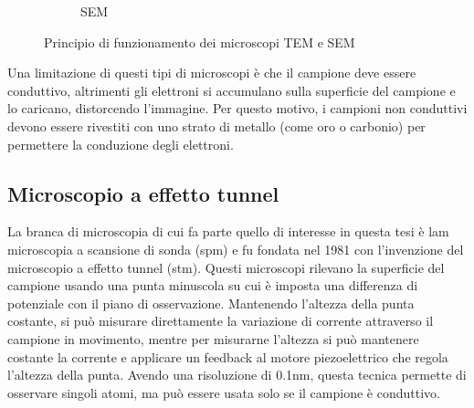 \documentclass[../main.tex]{subfiles}
\begin{document}
\begin{figure}[htbp]
\begin{subfigure}[t]{5cm}
	\caption{SEM}
\end{subfigure}%
\caption{Principio di funzionamento dei microscopi TEM e SEM}
\label{fig:em_diag}
\end{figure}

Una limitazione di questi tipi di microscopi è che il campione deve essere conduttivo, altrimenti gli elettroni si accumulano sulla superficie del campione e lo caricano, distorcendo l'immagine. Per questo motivo, i campioni non conduttivi devono essere rivestiti con uno strato di metallo (come oro o carbonio) per permettere la conduzione degli elettroni.


\subsection{Microscopio a effetto tunnel}

La branca di microscopia di cui fa parte quello di interesse in questa tesi è lam microscopia a scansione di sonda (\acrshort{spm}) e fu fondata nel 1981 con l'invenzione del microscopio a effetto tunnel (\acrshort{stm}).\cite{ieee_spm}
Questi microscopi rilevano la superficie del campione usando una punta minuscola su cui è imposta una differenza di potenziale con il piano di osservazione. Mantenendo l'altezza della punta costante, si può misurare direttamente la variazione di corrente attraverso il campione in movimento, mentre per misurarne l'altezza si può mantenere costante la corrente e applicare un feedback al motore piezoelettrico che regola l'altezza della punta. Avendo una risoluzione di 0.1nm, questa tecnica permette di osservare singoli atomi, ma può essere usata solo se il campione è conduttivo.\cite{bai_2000}
\end{document}
